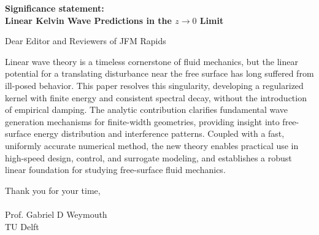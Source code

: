 \documentclass[12pt]{article}
\begin{document}
\noindent
\textbf{Significance statement: \\
Linear Kelvin Wave Predictions in the $z\to 0$ Limit}
\vspace{1cm}

\noindent
Dear Editor and Reviewers of JFM Rapids

\vspace{1cm}

Linear wave theory is a timeless cornerstone of fluid mechanics, but the linear potential for a translating disturbance near the free surface has long suffered from ill-posed behavior. This paper resolves this singularity, developing a regularized kernel with finite energy and consistent spectral decay, without the introduction of empirical damping. The analytic contribution clarifies fundamental wave generation mechanisms for finite-width geometries, providing insight into free-surface energy distribution and interference patterns. Coupled with a fast, uniformly accurate numerical method, the new theory enables practical use in high-speed design, control, and surrogate modeling, and establishes a robust linear foundation for studying free-surface fluid mechanics.

\vspace{1cm}

\noindent
Thank you for your time,\\ \\
Prof. Gabriel D Weymouth\\
TU Delft
\end{document}
